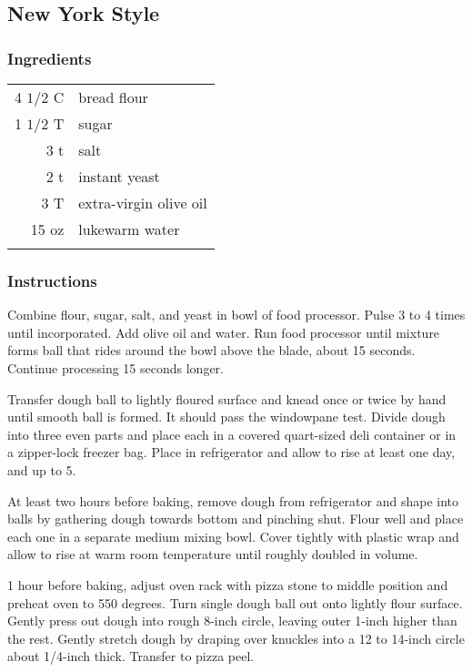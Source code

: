 \documentclass[12pt,landscape,twoside,twocolumn, openright, titlepage, draft]{book}
\begin{document}
\subsection{New York Style}
\subsubsection{Ingredients}
\begin{tabular}{r p{1.5in}}
4 $1/2$ C  & bread flour \\ 
1 $1/2$ T  & sugar \\ 
3 t        & salt  \\ 
2 t        & instant yeast \\ 
3 T        & extra-virgin olive oil  \\
15 oz      & lukewarm water \\ \\
\end{tabular}

\subsubsection{Instructions}

Combine flour, sugar, salt, and yeast in bowl of food processor. Pulse 3 to 4 times until incorporated. Add olive oil and water. Run food processor until mixture forms ball that rides around the bowl above the blade, about 15 seconds. Continue processing 15 seconds longer.

Transfer dough ball to lightly floured surface and knead once or twice by hand until smooth ball is formed. It should pass the windowpane test. Divide dough into three even parts and place each in a covered quart-sized deli container or in a zipper-lock freezer bag. Place in refrigerator and allow to rise at least one day, and up to 5.

At least two hours before baking, remove dough from refrigerator and shape into balls by gathering dough towards bottom and pinching shut. Flour well and place each one in a separate medium mixing bowl. Cover tightly with plastic wrap and allow to rise at warm room temperature until roughly doubled in volume.

1 hour before baking, adjust oven rack with pizza stone to middle position and preheat oven to 550 degrees. Turn single dough ball out onto lightly flour surface. Gently press out dough into rough 8-inch circle, leaving outer 1-inch higher than the rest. Gently stretch dough by draping over knuckles into a 12 to 14-inch circle about 1/4-inch thick. Transfer to pizza peel.
\end{document}
